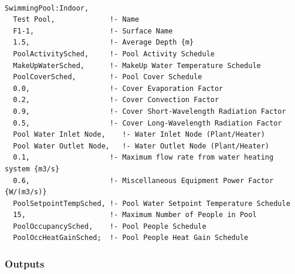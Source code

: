 \begin{lstlisting}

SwimmingPool:Indoor,
  Test Pool,             !- Name
  F1-1,                  !- Surface Name
  1.5,                   !- Average Depth {m}
  PoolActivitySched,     !- Pool Activity Schedule
  MakeUpWaterSched,      !- MakeUp Water Temperature Schedule
  PoolCoverSched,        !- Pool Cover Schedule
  0.0,                   !- Cover Evaporation Factor
  0.2,                   !- Cover Convection Factor
  0.9,                   !- Cover Short-Wavelength Radiation Factor
  0.5,                   !- Cover Long-Wavelength Radiation Factor
  Pool Water Inlet Node,    !- Water Inlet Node (Plant/Heater)
  Pool Water Outlet Node,   !- Water Outlet Node (Plant/Heater)
  0.1,                   !- Maximum flow rate from water heating system {m3/s}
  0.6,                   !- Miscellaneous Equipment Power Factor {W/(m3/s)}
  PoolSetpointTempSched, !- Pool Water Setpoint Temperature Schedule
  15,                    !- Maximum Number of People in Pool
  PoolOccupancySched,    !- Pool People Schedule
  PoolOccHeatGainSched;  !- Pool People Heat Gain Schedule
\end{lstlisting}

\subsubsection{Outputs}\label{outputs-4-007}

